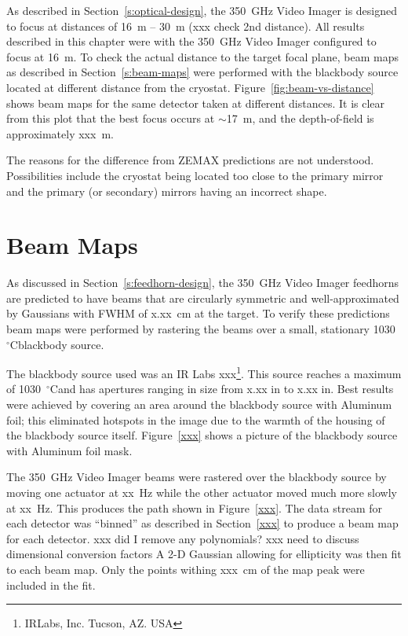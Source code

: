 \documentclass[10pt,twocolumn,article]{memoir}
\newcommand*{\figref}[1]{Figure~\ref{#1}}
\newcommand*{\sectionref}[1]{Section~\ref{#1}}
\newcommand*{\FWHM}{{\small FWHM}\xspace}
\newcommand*{\ZEMAX}{{\small ZEMAX}\xspace}
\newcommand*{\Imager}{350~GHz Video Imager\xspace}
\newcommand*{\degC}{\ensuremath{^{\circ}}C}
\begin{document}
As described in \sectionref{s:optical-design}, the \Imager is designed to focus at distances of 16~m -- 30~m (xxx check 2nd distance).
All results described in this chapter were with the \Imager configured to focus at 16~m.
To check the actual distance to the target focal plane, beam maps as described in \sectionref{s:beam-maps} were performed with the blackbody source located at different distance from the cryostat.
\figref{fig:beam-vs-distance} shows beam maps for the same detector taken at different distances.
It is clear from this plot that the best focus occurs at $\sim$17~m, and the depth-of-field is approximately xxx~m.

The reasons for the difference from \ZEMAX predictions are not understood.
Possibilities include the cryostat being located too close to the primary mirror and the primary (or secondary) mirrors having an incorrect shape.

\section{Beam Maps}

As discussed in \sectionref{s:feedhorn-design}, the \Imager feedhorns are predicted to have beams that are circularly symmetric and well-approximated by Gaussians with \FWHM of x.xx~cm at the target.
To verify these predictions beam maps were performed by rastering the beams over a small, stationary 1030~\degC blackbody source.

The blackbody source used was an IR Labs xxx\footnote{IRLabs, Inc. Tucson, AZ. USA}.
This source reaches a maximum of 1030~\degC and has apertures ranging in size from x.xx in to x.xx in.
Best results were achieved by covering an area around the blackbody source with Aluminum foil; this eliminated hotspots in the image due to the warmth of the housing of the blackbody source itself.
\figref{xxx} shows a picture of the blackbody source with Aluminum foil mask.

The \Imager beams were rastered over the blackbody source by moving one actuator at xx~Hz while the other actuator moved much more slowly at xx~Hz.
This produces the path shown in \figref{xxx}.
The data stream for each detector was ``binned'' as described in \sectionref{xxx} to produce a beam map for each detector.
xxx did I remove any polynomials?
xxx need to discuss dimensional conversion factors
A 2-D Gaussian allowing for ellipticity was then fit to each beam map.
Only the points withing xxx~cm of the map peak were included in the fit.
\end{document}
